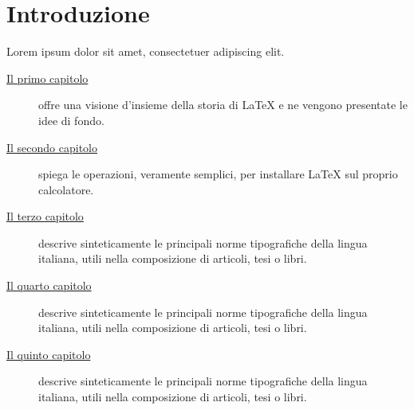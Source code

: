 
\cleardoublepage
{}

\chapter*{Introduzione}

\lipsum[1]

Lorem ipsum dolor sit amet, consectetuer adipiscing elit.

\begin{description}
\item[{\hyperref[cap:ctbn]{Il primo capitolo}}]
offre una visione d'insieme della storia di \LaTeX{} e ne vengono presentate le idee di fondo.
\item[{\hyperref[cap:ctbnc]{Il secondo capitolo}}]
spiega le operazioni, veramente semplici, per installare \LaTeX{} sul proprio calcolatore.
\item[{\hyperref[cap:r]{Il terzo capitolo}}]
descrive sinteticamente le principali norme tipografiche della lingua italiana, utili nella composizione di articoli, tesi o libri.
\item[{\hyperref[cap:esperimenti]{Il quarto capitolo}}]
descrive sinteticamente le principali norme tipografiche della lingua italiana, utili nella composizione di articoli, tesi o libri.
\item[{\hyperref[cap:conclusioni]{Il quinto capitolo}}]
descrive sinteticamente le principali norme tipografiche della lingua italiana, utili nella composizione di articoli, tesi o libri.
\end{description}


